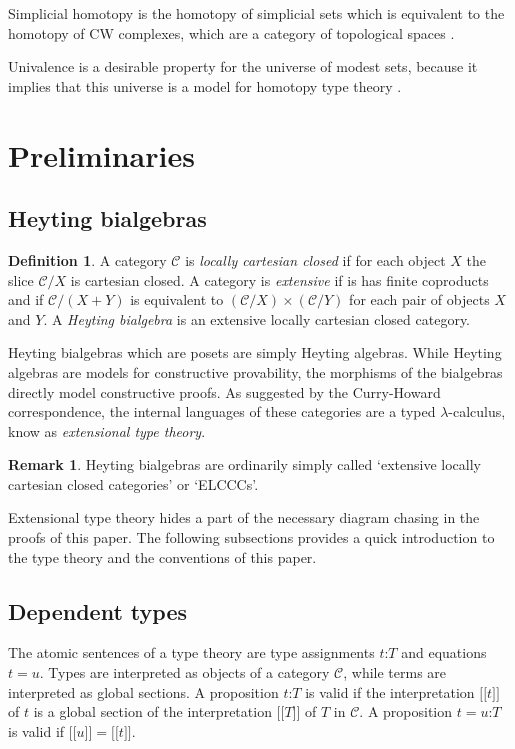 \documentclass{amsart}
\theoremstyle{plain}
\theoremstyle{definition}
\newtheorem{defin}[theorem]{Definition}
\newtheorem{remark}[theorem]{Remark}
\newcommand\cat\mathcal
\newcommand\of{\mathord:}
\newcommand\db[1]{{[\![}#1{]\!]}}
\begin{document}
Simplicial homotopy is the homotopy of simplicial sets which is equivalent to the homotopy of CW complexes, which are a category of topological spaces \cite{Hovey99,GJSHT}.

Univalence is a desirable property for the universe of modest sets, because it implies that this universe is a model for homotopy type theory \cite{hottbook,KLV12}.

\section{Preliminaries}

\newcommand\gen\gamma
\subsection{Heyting bialgebras}
\begin{defin} A category $\cat C$ is \emph{locally cartesian closed} if for each object $X$ the slice $\cat C/X$ is cartesian closed. A category is \emph{extensive} if is has finite coproducts and if $\cat C/(X+Y)$ is equivalent to $(\cat C/X)\times(\cat C/Y)$ for each pair of objects $X$ and $Y$. A \emph{Heyting bialgebra} is an extensive locally cartesian closed category. \label{Heyting bialgebra}
\end{defin}

Heyting bialgebras which are posets are simply Heyting algebras. While Heyting algebras are models for constructive provability, the morphisms of the bialgebras directly model constructive proofs. As suggested by the Curry-Howard correspondence, the internal languages of these categories are a typed $\lambda$-calculus, know as \emph{extensional type theory}.

\begin{remark} Heyting bialgebras are ordinarily simply called `extensive locally cartesian closed categories' or `ELCCCs'. \end{remark}

Extensional type theory hides a part of the necessary diagram chasing in the proofs of this paper. The following subsections provides a quick introduction to the type theory and the conventions of this paper.

\subsection{Dependent types}
The atomic sentences of a type theory are type assignments $t\of T$ and equations $t=u$. Types are interpreted as objects of a category $\cat C$, while terms are interpreted as global sections. A proposition $t\of T$ is valid if the interpretation $\db t$ of $t$ is a global section of the interpretation $\db T$ of $T$ in $\cat C$. A proposition $t=u\of T$ is valid if $\db u=\db t$. 
\end{document}
